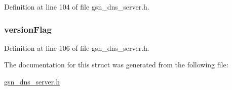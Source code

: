 Definition at line 104 of file gsn\_\-dns\_\-server.h.

\hypertarget{a00055_a7d1eb61b5440a79b7efef1031c5a1333}{
\subsubsection[{versionFlag}]{ {\bf versionFlag}}}
\label{a00055_a7d1eb61b5440a79b7efef1031c5a1333}


Definition at line 106 of file gsn\_\-dns\_\-server.h.



The documentation for this struct was generated from the following file:\begin{DoxyCompactItemize}
\item 
\hyperlink{a00485}{gsn\_\-dns\_\-server.h}\end{DoxyCompactItemize}
